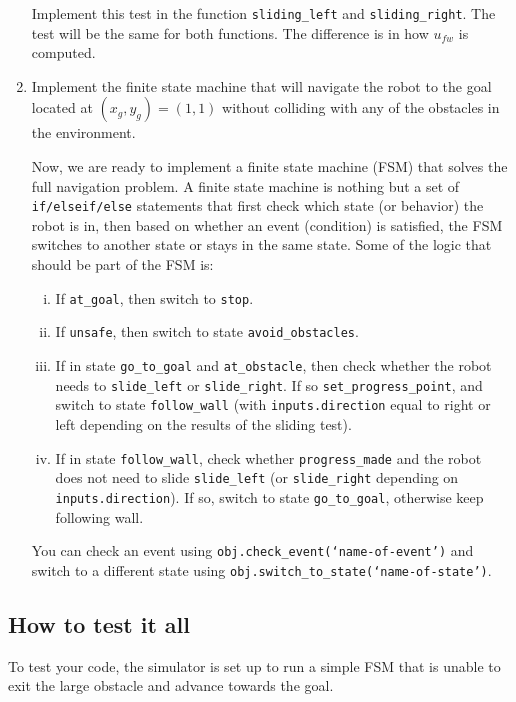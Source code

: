 \documentclass[10pt]{article}
\begin{document}
\begin{enumerate}
  Implement this test in the function \texttt{sliding\_left} and \texttt{sliding\_right}. The test will be the same for both functions. The difference is in how $u_{fw}$ is computed.
  \item Implement the finite state machine that will navigate the robot to the goal located at $(x_g,y_g)=(1,1)$ without colliding with any of the obstacles in the environment.
  
  Now, we are ready to implement a finite state machine (FSM) that solves the full navigation problem. A finite state machine is nothing but a set of \texttt{if/elseif/else} statements that first check which state (or behavior) the robot is in, then based on whether an event (condition) is satisfied, the FSM switches to another state or stays in the same state. Some of the logic that should be part of the FSM is:
  
  \begin{enumerate}[(i)]
    \item If \texttt{at\_goal}, then switch to \texttt{stop}.
    \item If \texttt{unsafe}, then switch to state \texttt{avoid\_obstacles}.
    \item If in state \texttt{go\_to\_goal} and \texttt{at\_obstacle}, then check whether the robot needs to \texttt{slide\_left} or \texttt{slide\_right}. If so \texttt{set\_progress\_point}, and switch to state \texttt{follow\_wall} (with \texttt{inputs.direction} equal to right or left depending on the results of the sliding test).
    \item If in state \texttt{follow\_wall}, check whether \texttt{progress\_made} and the robot does not need to slide \texttt{slide\_left} (or \texttt{slide\_right} depending on \texttt{inputs.direction}). If so, switch to state \texttt{go\_to\_goal}, otherwise keep following wall.
  \end{enumerate}
  
  You can check an event using \texttt{obj.check\_event(`name-of-event')} and switch to a different state using \texttt{obj.switch\_to\_state(`name-of-state')}.
\end{enumerate}

\subsection*{How to test it all}
To test your code, the simulator is set up to run a simple FSM that is unable to exit the large obstacle and advance towards the goal.
\end{document}
